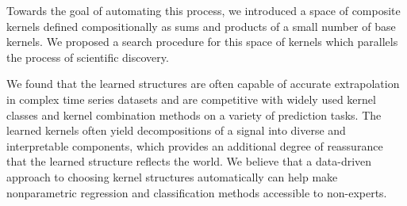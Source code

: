 \documentclass[twoside]{article}
\begin{document}
Towards the goal of automating this process, we introduced a space of composite kernels defined compositionally as sums and products of a small number of base kernels.
We proposed a search procedure for this space of kernels which parallels the process of scientific discovery.

We found that the learned structures are often capable of accurate extrapolation in complex time series datasets and are competitive with widely used kernel classes and kernel combination methods on a variety of prediction tasks.
The learned kernels often yield decompositions of a signal into diverse and interpretable components, which provides an additional degree of reassurance that the learned structure reflects the world.
We believe that a data-driven approach to choosing kernel structures automatically can help make nonparametric regression and classification methods accessible to non-experts.












\end{document}
